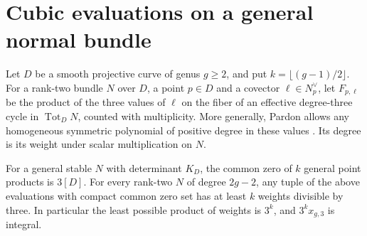 \section{Cubic evaluations on a general normal bundle}\label{sec:evaluations}

Let $D$ be a smooth projective curve of genus $g\geq2$, and put
$k=\lfloor(g-1)/2\rfloor$. For a rank-two bundle $N$ over $D$, a point
$p\in D$ and a covector $\ell\in N_p^\vee$, let $F_{p,\ell}$ be the
product of the three values of $\ell$ on the fiber of an effective
degree-three cycle in $\operatorname{Tot}_D N$, counted with multiplicity.
More generally, Pardon allows any homogeneous symmetric polynomial of
positive degree in these values \cite[(4.15)]{Pardon}. Its degree is its
weight under scalar multiplication on $N$.

\begin{theorem}\label{thm:cubic-evaluations}
For a general stable $N$ with determinant $K_D$, the common zero of $k$
general point products is $3[D]$. For every rank-two $N$ of degree $2g-2$,
any tuple of the above evaluations with compact common zero set has at
least $k$ weights divisible by three. In particular the least possible
product of weights is $3^k$, and $3^k x_{g,3}$ is integral.
\end{theorem}

